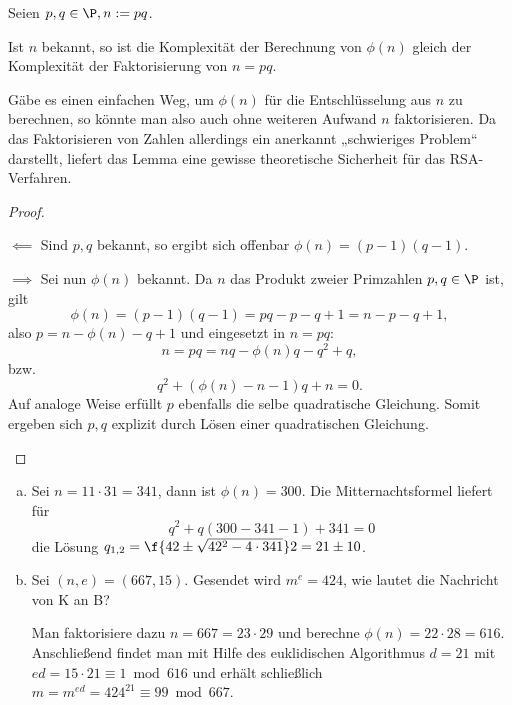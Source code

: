 \begin{lem} \label{3.3}
	Seien $p, q \in \P, n := pq$.

	Ist $n$ bekannt, so ist die Komplexität der Berechnung von $\phi(n)$ gleich der Komplexität der Faktorisierung von $n = pq$.
	\begin{note}
		Gäbe es einen einfachen Weg, um $\phi(n)$ für die Entschlüsselung aus $n$ zu berechnen, so könnte man also auch ohne weiteren Aufwand $n$ faktorisieren.
		Da das Faktorisieren von Zahlen allerdings ein anerkannt „schwieriges Problem“ darstellt, liefert das Lemma eine gewisse theoretische Sicherheit für das RSA-Verfahren.
	\end{note}
	\begin{proof}
		\begin{segnb}{$\impliedby$}
			Sind $p, q$ bekannt, so ergibt sich offenbar $\phi(n) = (p-1)(q-1)$.
		\end{segnb}
		\begin{segnb}{$\implies$}
			Sei nun $\phi(n)$ bekannt.
			Da $n$ das Produkt zweier Primzahlen $p, q \in \P$ ist, gilt
			\[
				\phi(n)
				= (p-1)(q-1)
				= pq - p - q + 1
				= n - p - q + 1,
			\]
			also $p = n - \phi(n) - q + 1$ und eingesetzt in $n = pq$:
			\[
				n = pq = nq - \phi(n)q - q^2 + q,
			\]
			bzw.
			\[
				q^2 + (\phi(n) - n - 1)q + n = 0.
			\]
			Auf analoge Weise erfüllt $p$ ebenfalls die selbe quadratische Gleichung.
			Somit ergeben sich $p,q$ explizit durch Lösen einer quadratischen Gleichung.
		\end{segnb}
	\end{proof}
\end{lem}



\begin{ex} \label{3.4}
	\begin{enumerate}[a)]
		\item
			Sei $n = 11 \cdot 31 = 341$, dann ist $\phi(n) = 300$.
			Die Mitternachtsformel liefert für
			\[
				q^2 + q(300 - 341 - 1) + 341 = 0
			\]
			die Lösung $q_{1,2} = \f{42 \pm \sqrt{42^2 - 4\cdot 341}}2 = 21 \pm 10$.
		\item
			Sei $(n, e) = (667, 15)$.
			Gesendet wird $m^e = 424$, wie lautet die Nachricht von K an B?

			Man faktorisiere dazu $n = 667 = 23 \cdot 29$ und berechne $\phi(n) = 22 \cdot 28 = 616$.
			Anschließend findet man mit Hilfe des euklidischen Algorithmus $d = 21$ mit $ed = 15 \cdot 21 \equiv 1 \bmod 616$ und erhält schließlich $m = m^{ed} = 424^{21} \equiv 99 \bmod 667$.
	\end{enumerate}
\end{ex}

